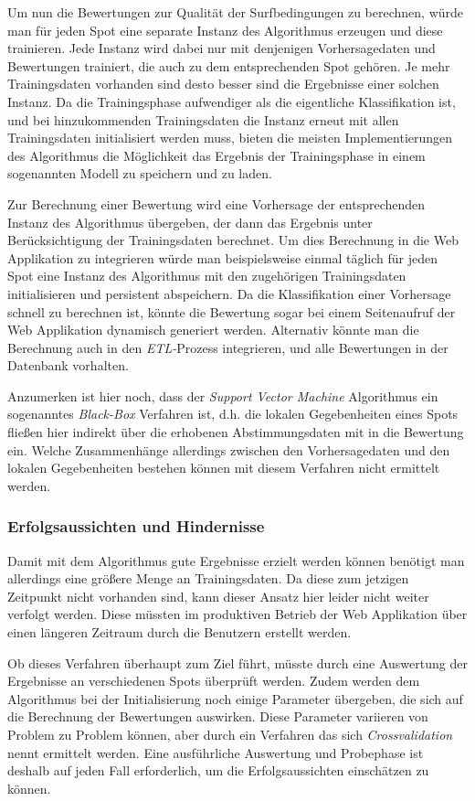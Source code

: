 Um nun die Bewertungen zur Qualität der Surfbedingungen zu berechnen,
würde man für jeden Spot eine separate Instanz des Algorithmus
erzeugen und diese trainieren. Jede Instanz wird dabei nur mit
denjenigen Vorhersagedaten und Bewertungen trainiert, die auch zu dem
entsprechenden Spot gehören. Je mehr Trainingsdaten vorhanden sind
desto besser sind die Ergebnisse einer solchen Instanz. Da die
Trainingsphase aufwendiger als die eigentliche Klassifikation ist, und
bei hinzukommenden Trainingsdaten die Instanz erneut mit allen
Trainingsdaten initialisiert werden muss, bieten die meisten
Implementierungen des Algorithmus die Möglichkeit das Ergebnis der
Trainingsphase in einem sogenannten Modell zu speichern und zu laden.

Zur Berechnung einer Bewertung wird eine Vorhersage der entsprechenden
Instanz des Algorithmus übergeben, der dann das Ergebnis unter
Berücksichtigung der Trainingsdaten berechnet. Um dies Berechnung in
die Web Applikation zu integrieren würde man beispielsweise einmal
täglich für jeden Spot eine Instanz des Algorithmus mit den
zugehörigen Trainingsdaten initialisieren und persistent
abspeichern. Da die Klassifikation einer Vorhersage schnell zu
berechnen ist, könnte die Bewertung sogar bei einem Seitenaufruf der
Web Applikation dynamisch generiert werden. Alternativ könnte man die
Berechnung auch in den \textit{ETL-}Prozess integrieren, und alle
Bewertungen in der Datenbank vorhalten.

Anzumerken ist hier noch, dass der \textit{Support Vector Machine}
Algorithmus ein sogenanntes \textit{Black-Box} Verfahren ist, d.h. die
lokalen Gegebenheiten eines Spots fließen hier indirekt über die
erhobenen Abstimmungsdaten mit in die Bewertung ein. Welche
Zusammenhänge allerdings zwischen den Vorhersagedaten und den lokalen
Gegebenheiten bestehen können mit diesem Verfahren nicht ermittelt
werden.

\subsubsection{Erfolgsaussichten und Hindernisse}
Damit mit dem Algorithmus gute Ergebnisse erzielt werden können
benötigt man allerdings eine größere Menge an Trainingsdaten. Da diese
zum jetzigen Zeitpunkt nicht vorhanden sind, kann dieser Ansatz hier
leider nicht weiter verfolgt werden. Diese müssten im produktiven
Betrieb der Web Applikation über einen längeren Zeitraum durch die
Benutzern erstellt werden.

Ob dieses Verfahren überhaupt zum Ziel führt, müsste durch eine
Auswertung der Ergebnisse an verschiedenen Spots überprüft
werden. Zudem werden dem Algorithmus bei der Initialisierung noch
einige Parameter übergeben, die sich auf die Berechnung der
Bewertungen auswirken. Diese Parameter variieren von Problem zu
Problem können, aber durch ein Verfahren das sich
\textit{Crossvalidation} nennt ermittelt werden. Eine ausführliche
Auswertung und Probephase ist deshalb auf jeden Fall erforderlich, um
die Erfolgsaussichten einschätzen zu können.


